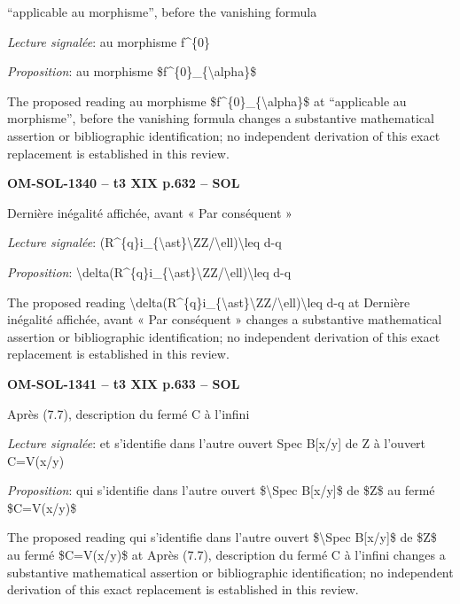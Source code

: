“applicable au morphisme”, before the vanishing formula\par
\emph{Lecture signalée}: au morphisme f\textasciicircum{}\{0\}\par
\emph{Proposition}: au morphisme \$f\textasciicircum{}\{0\}\_\{\textbackslash{}alpha\}\$\par
The proposed reading au morphisme \$f\textasciicircum{}\{0\}\_\{\textbackslash{}alpha\}\$ at “applicable au morphisme”, before the vanishing formula changes a substantive mathematical assertion or bibliographic identification; no independent derivation of this exact replacement is established in this review.\par
\par\noindent\textbf{OM-SOL-1340 -- t3 XIX p.632 -- SOL}\par
Dernière inégalité affichée, avant « Par conséquent »\par
\emph{Lecture signalée}: (R\textasciicircum{}\{q\}i\_\{\textbackslash{}ast\}\textbackslash{}ZZ/\textbackslash{}ell)\textbackslash{}leq d-q\par
\emph{Proposition}: \textbackslash{}delta(R\textasciicircum{}\{q\}i\_\{\textbackslash{}ast\}\textbackslash{}ZZ/\textbackslash{}ell)\textbackslash{}leq d-q\par
The proposed reading \textbackslash{}delta(R\textasciicircum{}\{q\}i\_\{\textbackslash{}ast\}\textbackslash{}ZZ/\textbackslash{}ell)\textbackslash{}leq d-q at Dernière inégalité affichée, avant « Par conséquent » changes a substantive mathematical assertion or bibliographic identification; no independent derivation of this exact replacement is established in this review.\par
\par\noindent\textbf{OM-SOL-1341 -- t3 XIX p.633 -- SOL}\par
Après (7.7), description du fermé C à l'infini\par
\emph{Lecture signalée}: et s'identifie dans l'autre ouvert Spec B[x/y] de Z à l'ouvert C=\allowbreak V(x/y)\par
\emph{Proposition}: qui s'identifie dans l'autre ouvert \$\textbackslash{}Spec B[x/y]\$ de \$Z\$ au fermé \$C=\allowbreak V(x/y)\$\par
The proposed reading qui s'identifie dans l'autre ouvert \$\textbackslash{}Spec B[x/y]\$ de \$Z\$ au fermé \$C=\allowbreak V(x/y)\$ at Après (7.7), description du fermé C à l'infini changes a substantive mathematical assertion or bibliographic identification; no independent derivation of this exact replacement is established in this review.\par
